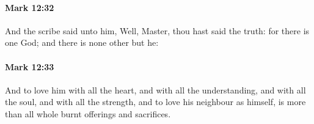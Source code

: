 		\paragraph{Mark 12:32} %
			\label{MARK-12-32}

			And the scribe said unto him, Well, Master, thou hast said the truth: for there is one God; and there is none other but he:

			\begin{framed}
			\scriptsize
				\begin{compactdesc}
					\item[SBLG] 
				\end{compactdesc}
			\end{framed}

		\paragraph{Mark 12:33} %
			\label{MARK-12-33}

			And to love him with all the heart, and with all the understanding, and with all the soul, and with all the strength, and to love his neighbour as himself, is more than all whole burnt offerings and sacrifices.


